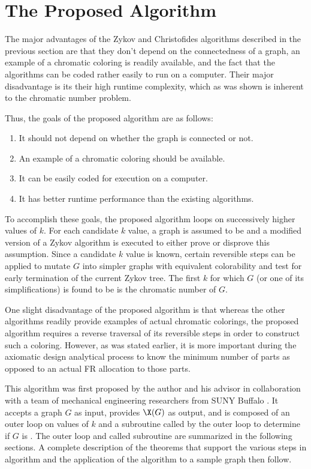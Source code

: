 \section{The Proposed Algorithm}\label{sec:algorithm}

The major advantages of the Zykov and Christofides algorithms described in the previous section are that they don't
depend on the connectedness of a graph, an example of a chromatic coloring is readily available, and the fact that
the algorithms can be coded rather easily to run on a computer.  Their major disadvantage is its their high runtime
complexity, which as was shown is inherent to the chromatic number problem.

Thus, the goals of the proposed algorithm are as follows:
\begin{enumerate}
\item It should not depend on whether the graph is connected or not.
\item An example of a chromatic coloring should be available.
\item It can be easily coded for execution on a computer.
\item It has better runtime performance than the existing algorithms.
\end{enumerate}

To accomplish these goals, the proposed algorithm loops on successively higher values of \(k\).  For each candidate
\(k\) value, a graph is assumed to be  and a modified version of a Zykov algorithm is executed to
either prove or disprove this assumption.  Since a candidate \(k\) value is known, certain reversible steps can be
applied to mutate \(G\) into simpler graphs with equivalent colorability and test for early termination of the
current Zykov tree.  The first \(k\) for which \(G\) (or one of its simplifications) is found to be 
is the chromatic number of \(G\).

One slight disadvantage of the proposed algorithm is that whereas the other algorithms readily provide examples of
actual chromatic colorings, the proposed algorithm requires a reverse traversal of its reversible steps in order to
construct such a coloring.  However, as was stated earlier, it is more important during the axiomatic design
analytical process to know the minimum number of parts as opposed to an actual FR allocation to those parts.

This algorithm was first proposed by the author and his advisor in collaboration with a team of mechanical
engineering researchers from SUNY Buffalo \cite{cavallaro}.  It accepts a graph \(G\) as input, provides \(\X(G)\)
as output, and is composed of an outer loop on values of \(k\) and a subroutine called by the outer loop to
determine if \(G\) is .  The outer loop and called subroutine are summarized in the following
sections.  A complete description of the theorems that support the various steps in algorithm and the application
of the algorithm to a sample graph then follow.

